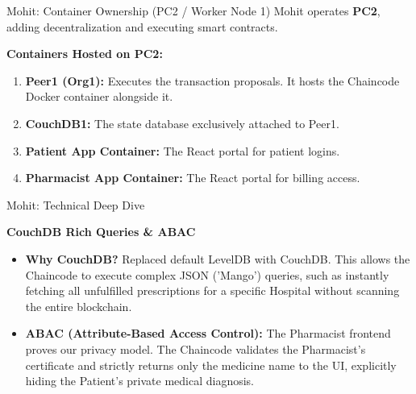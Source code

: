 \documentclass[10pt,aspectratio=169]{beamer}
\begin{document}
\begin{frame}{Mohit: Container Ownership (PC2 / Worker Node 1)}
    Mohit operates \textbf{PC2}, adding decentralization and executing smart contracts.
    \vspace{0.5cm}
    
    \textbf{Containers Hosted on PC2:}
    \begin{enumerate}
        \item \textbf{Peer1 (Org1):} Executes the transaction proposals. It hosts the Chaincode Docker container alongside it.
        \item \textbf{CouchDB1:} The state database exclusively attached to Peer1. 
        \item \textbf{Patient App Container:} The React portal for patient logins.
        \item \textbf{Pharmacist App Container:} The React portal for billing access.
    \end{enumerate}
\end{frame}

\begin{frame}{Mohit: Technical Deep Dive}
    \begin{center}
        \textbf{CouchDB Rich Queries \& ABAC}
    \end{center}
    \vspace{0.2cm}
    \begin{itemize}
        \item \textbf{Why CouchDB?} Replaced default LevelDB with CouchDB. This allows the Chaincode to execute complex JSON ('Mango') queries, such as instantly fetching all unfulfilled prescriptions for a specific Hospital without scanning the entire blockchain.
        \item \textbf{ABAC (Attribute-Based Access Control):} The Pharmacist frontend proves our privacy model. The Chaincode validates the Pharmacist's certificate and strictly returns only the medicine name to the UI, explicitly hiding the Patient's private medical diagnosis.
    \end{itemize}
\end{frame}

\end{document}
